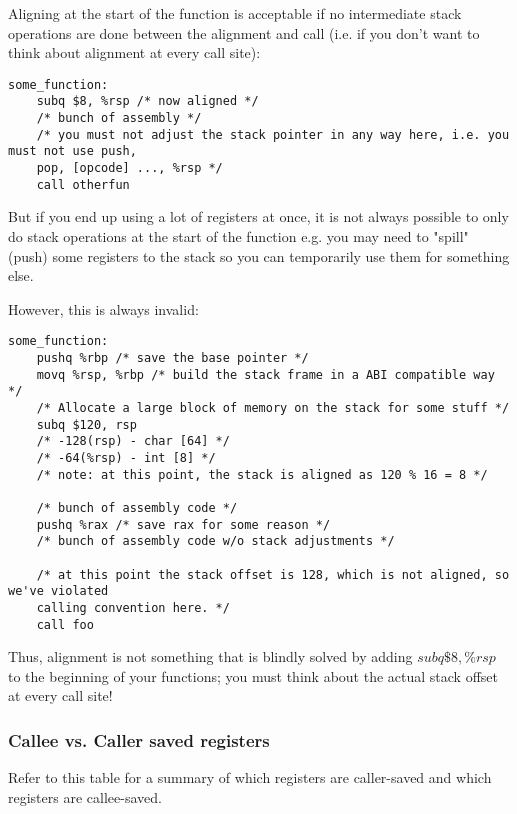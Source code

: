 \documentclass[11pt]{article}
\begin{document}
Aligning at the start of the function is acceptable if no intermediate stack operations
are done between the alignment and call (i.e. if you don't want to think about alignment
at every call site):

\begin{lstlisting}
some_function:
    subq $8, %rsp /* now aligned */
    /* bunch of assembly */
    /* you must not adjust the stack pointer in any way here, i.e. you must not use push,
    pop, [opcode] ..., %rsp */
    call otherfun
\end{lstlisting}

But if you end up using a lot of registers at once, it is not always possible to only do
stack operations at the start of the function e.g. you may need to "spill" (push) some
registers to the stack so you can temporarily use them for something else.

However, this is always invalid:

\begin{lstlisting}
some_function:
    pushq %rbp /* save the base pointer */
    movq %rsp, %rbp /* build the stack frame in a ABI compatible way */
    /* Allocate a large block of memory on the stack for some stuff */
    subq $120, rsp
    /* -128(rsp) - char [64] */
    /* -64(%rsp) - int [8] */
    /* note: at this point, the stack is aligned as 120 % 16 = 8 */

    /* bunch of assembly code */
    pushq %rax /* save rax for some reason */
    /* bunch of assembly code w/o stack adjustments */

    /* at this point the stack offset is 128, which is not aligned, so we've violated
    calling convention here. */
    call foo
\end{lstlisting}

Thus, alignment is not something that is blindly solved by adding $subq \$8, \%rsp$ to the
beginning of your functions; you must think about the actual stack offset at every call
site!

\subsubsection{Callee vs. Caller saved registers}

Refer to this table for a summary of which registers are caller-saved and which registers
are callee-saved.
\end{document}
